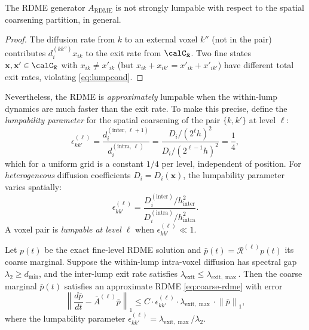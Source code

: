 \documentclass[review,onefignum,onetabnum]{siamart171218}
\newcommand{\bx}{\mathbf{x}}
\newcommand{\calR}{\mathcal{R}}
\newcommand{\norm}[1]{\left\|#1\right\|}
\begin{document}
\begin{proposition}
  \label{prop:not-strongly-lumpable}
  The RDME generator $A_{\mathrm{RDME}}$ is not strongly
  lumpable with respect to the spatial coarsening partition,
  in general.
\end{proposition}

\begin{proof}
  The diffusion rate from $k$ to an external voxel $k''$
  (not in the pair) contributes $d_i^{(kk'')} x_{ik}$ to
  the exit rate from $\calC_{\bar{\bx}}$.  Two fine states
  $\bx, \bx' \in \calC_{\bar{\bx}}$ with $x_{ik} \neq x'_{ik}$
  (but $x_{ik} + x_{ik'} = x'_{ik} + x'_{ik'}$) have different
  total exit rates, violating \eqref{eq:lumpcond}.
\end{proof}

Nevertheless, the RDME is \emph{approximately} lumpable when
the within-lump dynamics are much faster than the exit rate.
To make this precise, define the \emph{lumpability parameter}
for the spatial coarsening of the pair $\{k,k'\}$ at level $\ell$:
\begin{equation}
  \label{eq:lump-param}
  \epsilon_{kk'}^{(\ell)}
  = \frac{d_i^{(\mathrm{inter},\, \ell+1)}}
         {d_i^{(\mathrm{intra},\, \ell)}}
  = \frac{D_i / (2^\ell h)^2}{D_i / (2^{\ell-1} h)^2}
  = \frac{1}{4},
\end{equation}
which for a uniform grid is a constant $1/4$ per level,
independent of position.  For \emph{heterogeneous} diffusion
coefficients $D_i = D_i(\mathbf{x})$, the lumpability parameter
varies spatially:
\begin{equation}
  \label{eq:lump-param-hetero}
  \epsilon_{kk'}^{(\ell)}
  = \frac{D_i^{(\mathrm{inter})} / h_{\mathrm{inter}}^2}
         {D_i^{(\mathrm{intra})} / h_{\mathrm{intra}}^2}.
\end{equation}
A voxel pair is \emph{lumpable at level $\ell$} when
$\epsilon_{kk'}^{(\ell)} \ll 1$.

\begin{theorem}
  \label{thm:approx-lump}
  Let $p(t)$ be the exact fine-level RDME solution and
  $\bar{p}(t) = \calR^{(\ell)} p(t)$ its coarse marginal.
  Suppose the within-lump intra-voxel diffusion has spectral gap
  $\lambda_2 \geq d_{\min}$, and the inter-lump exit rate
  satisfies $\lambda_{\mathrm{exit}} \leq \lambda_{\mathrm{exit},\max}$.
  Then the coarse marginal $\bar{p}(t)$ satisfies an
  approximate RDME \eqref{eq:coarse-rdme} with error
  \begin{equation}
    \label{eq:lump-error}
    \norm{\frac{d\bar{p}}{dt} - \bar{A}^{(\ell)} \bar{p}}_1
    \leq C \cdot \epsilon_{kk'}^{(\ell)} \cdot \lambda_{\mathrm{exit},\max}
    \cdot \norm{\bar{p}}_1,
  \end{equation}
  where the lumpability parameter
  $\epsilon_{kk'}^{(\ell)} = \lambda_{\mathrm{exit},\max} / \lambda_2$.
\end{theorem}
\end{document}
